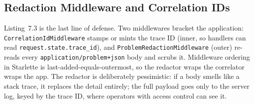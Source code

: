 \subsection{Redaction Middleware and Correlation IDs}

Listing~7.3 is the last line of defense. Two middlewares bracket the
application: \texttt{CorrelationIdMiddleware} stamps or mints the trace ID
(inner, so handlers can read \texttt{request.state.trace\_id}), and
\texttt{ProblemRedactionMiddleware} (outer) re-reads every
\texttt{application/problem+json} body and scrubs it. Middleware ordering in
Starlette is last-added-equals-outermost, so the redactor wraps the
correlator wraps the app. The redactor is deliberately pessimistic: if a
body smells like a stack trace, it replaces the detail entirely; the full
payload goes only to the server log, keyed by the trace ID, where operators
with access control can see it.


